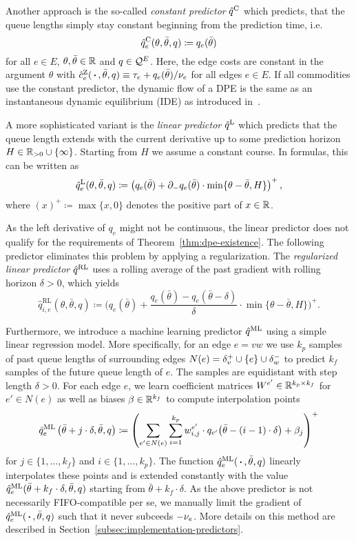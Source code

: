 Another approach is the so-called \emph{constant predictor} $\hat q^{\text{C}}$ which predicts, that the queue lengths simply stay constant beginning from the prediction time, i.e.
\[
    \hat q^{\text{C}}_{e}(\theta, \bar\theta, q) \coloneqq q_e(\bar\theta)
\]
for all $e\in E$, $\theta,\bar\theta\in\mathbb{R}$ and $q\in \mathcal{Q}^E$.
Here, the edge costs are constant in the argument $\theta$ with $\hat c^{\text{Z}}_e(\,\boldsymbol{\cdot}\,, \bar\theta, q)\equiv \tau_e + q_e(\bar\theta)/\nu_e$ for all edges $e\in E$.
If all commodities use the constant predictor, the dynamic flow of a DPE is the same as an instantaneous dynamic equilibrium (IDE) as introduced in~\cite[Definition~2.1]{Graf2020}.

A more sophisticated variant is the \emph{linear predictor} $\hat q^{\text{L}}$ which predicts that the queue length extends with the current derivative up to some prediction horizon $H\in \mathbb{R}_{>0} \cup \{ \infty \}$.
Starting from $H$ we assume a constant course.
In formulas, this can be written as \[
    \hat q^{\text{L}}_e(\theta,\bar\theta,q) \coloneqq \left( q_e(\bar\theta) + \partial_- q_e(\bar\theta) \cdot \min\{\theta - \bar\theta, H \} \right)^+,
\]
where $(x)^+\coloneqq \max\{ x, 0 \}$ denotes the positive part of $x\in\mathbb{R}$.

As the left derivative of $q_e$ might not be continuous, the linear predictor does not qualify for the requirements of Theorem~\ref{thm:dpe-existence}.
The following predictor eliminates this problem by applying a regularization.
The \emph{regularized linear predictor} $\hat q^{\text{RL}}$ uses a rolling average of the past gradient with rolling horizon $\delta>0$, which yields
\[
\hat q_{i,e}^{\text{RL}}(\theta, \bar\theta, q) \coloneqq
  \Big( q_e(\bar\theta) + \frac{q_e(\bar\theta) - q_e(\bar\theta - \delta)}{\delta} \cdot \min\{ \theta - \bar\theta, H \} \Big)^+.
\]

Furthermore, we introduce a machine learning predictor $\hat q^{\text{ML}}$ using a simple linear regression model.
More specifically, for an edge $e=vw$ we use $k_p$ samples of past queue lengths of surrounding edges $N(e) = \delta^+_{v} \cup \{ e \} \cup\delta^-_{w}$ to predict $k_f$ samples of the future queue length of $e$.
The samples are equidistant with step length $\delta > 0$.
For each edge $e$, we learn coefficient matrices $W^{e'}\in\mathbb{R}^{k_p\times k_f}$ for $e'\in N(e)$ as well as biases $\beta\in\mathbb{R}^{k_f}$ to compute interpolation points \[
    \hat q^{\text{ML}}_e\left(\bar\theta + j\cdot\delta,\bar\theta,q \right) \coloneqq 
    \left(
    \sum_{e'\in N(e)} \sum_{i = 1}^{k_p} w^{e'}_{i, j} \cdot {q_{e'}}{\left( 
        \bar\theta - (i-1)\cdot\delta
    \right)}
    + \beta_j
    \right)^+
\]
for $j\in\{1,\dots,k_f\}$ and $i\in\{1,\dots,k_p\}$.
The function $\hat q^{\text{ML}}_e(\,\boldsymbol{\cdot}\,, \bar\theta, q)$ linearly interpolates these points and is extended constantly with the value $\hat q^{\text{ML}}_e(\bar\theta + k_f\cdot\delta,\bar\theta,q )$ starting from $\bar\theta + k_f\cdot \delta$.
As the above predictor is not necessarily FIFO-compatible per se, we manually limit the gradient of $\hat q^{\text{ML}}_e(\,\boldsymbol{\cdot}\,, \bar\theta, q)$ such that it never subceeds $-\nu_e$.
More details on this method are described in Section~\ref{subsec:implementation-predictors}.

